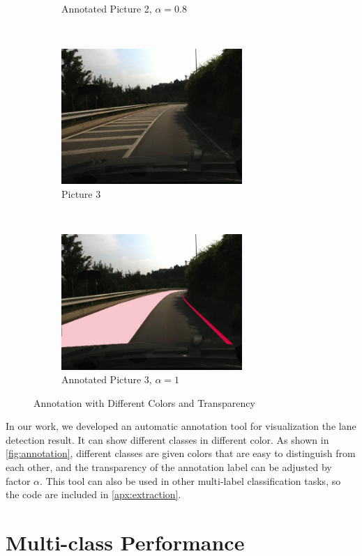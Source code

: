 \begin{spacing}{1.5}
\begin{figure}[!ht]
\begin{subfigure}[b]{0.49\textwidth}
        \caption{Annotated Picture 2, $\alpha=0.8$}
    \end{subfigure}
    \\
    \begin{subfigure}[b]{0.49\textwidth}
        \centering
        \includegraphics[width=2.7in, fbox]{Chapter5/Picture3.jpg}
        \caption{Picture 3}
    \end{subfigure}%
    ~
    \begin{subfigure}[b]{0.49\textwidth}
        \centering
        \includegraphics[width=2.7in, fbox]{Chapter5/Picture3an.jpg}
        \caption{Annotated Picture 3, $\alpha=1$}
    \end{subfigure}
    \caption{Annotation with Different Colors and Transparency}
    \label{fig:annotation}
\end{figure}


In our work, we developed an automatic annotation tool for visualization the lane detection result. It can show different classes in different color. As shown in \autoref{fig:annotation}, different classes are given colors that are easy to distinguish from each other, and the transparency of the annotation label can be adjusted by factor $\alpha$. This tool can also be used in other multi-label classification tasks, so the code are included in \autoref{apx:extraction}.

\section{Multi-class Performance}
\label{sec:EX_multiclass}


\end{spacing}
